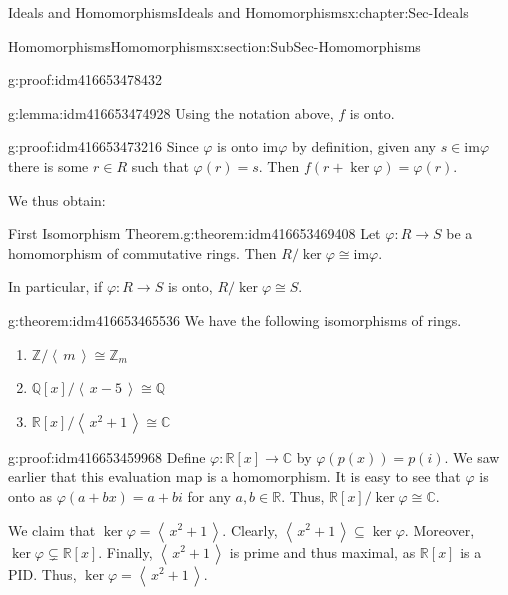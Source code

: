 \documentclass[oneside,10pt,]{book}
\numberwithin{equation}{section}
\newcommand{\ideal}[1]{\left\langle\, #1 \,\right\rangle}
\def\p{\varphi}
\def\im{\text{im}}
\def\C{{\mathbb C}}
\def\Z{{\mathbb Z}}
\def\Q{{\mathbb Q}}
\def\R{{\mathbb R}}
\begin{document}
\begin{chapterptx}{Ideals and Homomorphisms}{}{Ideals and Homomorphisms}{}{}{x:chapter:Sec-Ideals}
\begin{sectionptx}{Homomorphisms}{}{Homomorphisms}{}{}{x:section:SubSec-Homomorphisms}
\begin{proofptx}{}{g:proof:idm416653478432}
\end{proofptx}
\begin{lemma}{}{}{g:lemma:idm416653474928}%
Using the notation above, \(f\) is onto.%
\end{lemma}
\begin{proofptx}{}{g:proof:idm416653473216}
Since \(\p\) is onto \(\im \p\) by definition, given any \(s\in \im \p\) there is some \(r\in R\) such that \(\p(r) = s\). Then \(f(r+\ker\p) = \p(r)\).%
\end{proofptx}
We thus obtain:%
\begin{theorem}{First Isomorphism Theorem.}{}{g:theorem:idm416653469408}%
Let \(\p : R\to S\) be a homomorphism of commutative rings. Then \(R/\ker \p \cong \im \p\).%
\par
In particular, if \(\p : R\to S\) is onto, \(R/\ker \p \cong S\).%
\end{theorem}
\begin{theorem}{}{}{g:theorem:idm416653465536}%
We have the following isomorphisms of rings.%
\begin{enumerate}
\item{}\(\Z/\ideal{m} \cong \Z_m\)%
\item{}\(\Q[x]/\ideal{x-5} \cong \Q\)%
\item{}\(\R[x]/\ideal{x^2+1} \cong \C\)%
\end{enumerate}
%
\end{theorem}
\begin{proofptx}{}{g:proof:idm416653459968}
Define \(\p: \R[x] \to \C\) by \(\p(p(x)) = p(i)\). We saw earlier that this evaluation map is a homomorphism. It is easy to see that \(\p\) is onto as \(\p(a+bx) = a+bi\) for any \(a,b\in \R\). Thus, \(\R[x]/\ker\p \cong \C\).%
\par
We claim that \(\ker\p = \ideal{x^2+1}\). Clearly, \(\ideal{x^2+1} \subseteq \ker\p\). Moreover, \(\ker\p \subsetneq \R[x]\). Finally, \(\ideal{x^2+1}\) is prime and thus maximal, as \(\R[x]\) is a PID. Thus, \(\ker\p = \ideal{x^2+1}\).%
\end{proofptx}
\end{sectionptx}
\end{chapterptx}
%
\backmatter
%
%
%
%
\printindex
%
\end{document}
